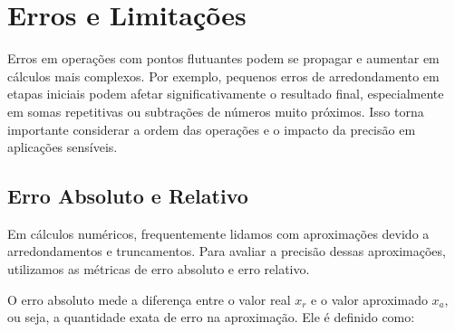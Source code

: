 

\section{Erros e Limitações}

Erros em operações com pontos flutuantes podem se propagar e aumentar em cálculos mais complexos. Por exemplo, pequenos erros de arredondamento em etapas iniciais podem afetar significativamente o resultado final, especialmente em somas repetitivas ou subtrações de números muito próximos. Isso torna importante considerar a ordem das operações e o impacto da precisão em aplicações sensíveis.

\subsection{Erro Absoluto e Relativo}

Em cálculos numéricos, frequentemente lidamos com aproximações devido a arredondamentos e truncamentos. Para avaliar a precisão dessas aproximações, utilizamos as métricas de erro absoluto e erro relativo.
  
O erro absoluto mede a diferença entre o valor real \( x_r \) e o valor aproximado \( x_a \), ou seja, a quantidade exata de erro na aproximação. Ele é definido como:

